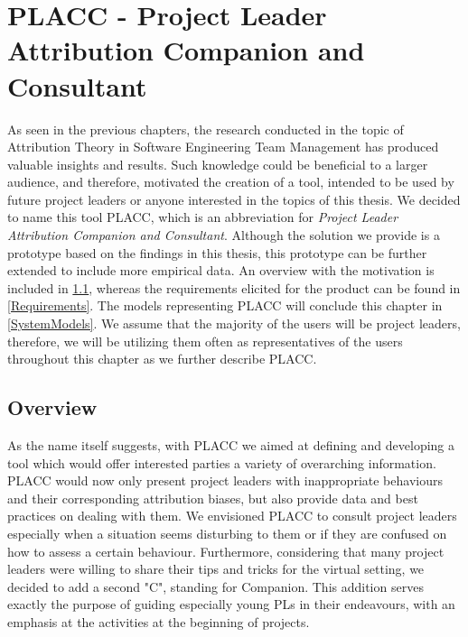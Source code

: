 \chapter{PLACC - Project Leader Attribution Companion and Consultant}


As seen in the previous chapters, the research conducted in the topic of Attribution Theory in Software Engineering Team Management has produced valuable insights and results.  Such knowledge could be beneficial to a larger audience,  and therefore, motivated the creation of a tool, intended to be used by future project leaders or anyone interested in the topics of this thesis. We decided to name this tool PLACC, which is an abbreviation for \textit{Project Leader Attribution Companion and Consultant}. Although the solution we provide is a prototype based on the findings in this thesis, this prototype can be further extended to include more empirical data.  An overview with the motivation is included in \ref{Overview}, whereas the requirements elicited for the product can be found in \ref{Requirements}. The models representing PLACC will conclude this chapter in \ref{SystemModels}.
We assume that the majority of the users will be project leaders, therefore, we will be utilizing them often as representatives of the users throughout this chapter as we further describe PLACC. 

\section{Overview} \label{Overview}

As the name itself suggests,  with PLACC we aimed at defining and developing a tool which would offer interested parties a variety of overarching information.  PLACC would now only present project leaders with inappropriate behaviours and their corresponding attribution biases, but also provide data and best practices on dealing with them. We envisioned PLACC to consult project leaders especially when a situation seems disturbing to them or if they are confused on how to assess a certain behaviour. 
Furthermore, considering that many project leaders were willing to share their tips and tricks for the virtual setting, we decided to add a second "C", standing for Companion. This addition serves exactly the purpose of guiding especially young PLs in their endeavours, with an emphasis at the activities at the beginning of projects.

